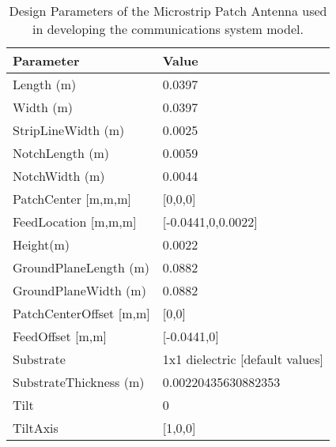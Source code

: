 \begin{table}[!h]
\centering
\begin{tabular}{|l|l|}
\hline
\textbf{Parameter}          & \textbf{Value}                      \\ \hline
Length (m)                  & 0.0397                              \\ \hline
Width (m)                   & 0.0397                              \\ \hline
StripLineWidth (m)          & 0.0025                              \\ \hline
NotchLength (m)             & 0.0059                              \\ \hline
NotchWidth (m)              & 0.0044                              \\ \hline
PatchCenter {[}m,m,m{]}     & {[}0,0,0{]}                         \\ \hline
FeedLocation {[}m,m,m{]}    & {[}-0.0441,0,0.0022{]}              \\ \hline
Height(m)                   & 0.0022                              \\ \hline
GroundPlaneLength (m)       & 0.0882                              \\ \hline
GroundPlaneWidth (m)        & 0.0882                              \\ \hline
PatchCenterOffset {[}m,m{]} & {[}0,0{]}                           \\ \hline
FeedOffset {[}m,m{]}        & {[}-0.0441,0{]}                     \\ \hline
Substrate                   & 1x1 dielectric {[}default values{]} \\ \hline
SubstrateThickness (m)                   & 0.00220435630882353 \\ \hline
Tilt                        & 0                                   \\ \hline
TiltAxis                    & {[}1,0,0{]}                         \\ \hline
\end{tabular}
\vspace{2 mm}
\caption{Design Parameters of the Microstrip Patch Antenna used in developing the communications system model.}
\label{AntennaParameters}
\end{table}


